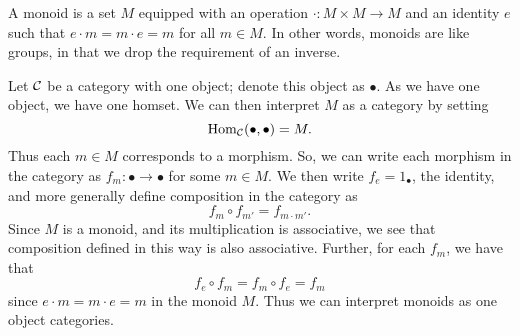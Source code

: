     \begin{example}
        A monoid is a set $M$ equipped with an operation $\cdot: M \times M \to M$ and 
        an identity $e$ such that $e\cdot m = m \cdot e = m$ for all $m \in M$. In other words, 
        monoids are like groups, in that we drop the requirement of an inverse. 

        Let $\mathcal{C}$ be a category with one object; denote this object as $\bullet$. 
        As we have one object, we have one homset. We can then interpret $M$ as a category
        by setting 
        \[
            \operatorname{\mathrm{Hom}}_{\mathcal{C}}(\bullet, \bullet) = M.   
        \]
        Thus each $m \in M$ corresponds to a morphism.
        So,
        we can write each morphism in the category as $f_{m}: \bullet \to \bullet$ 
        for some $m \in M$. 
        We then write $f_{e} = 1_{\bullet}$, the identity, and more generally 
        define composition in the category as
        \[
            f_m \circ f_{m'} = f_{m \cdot m'}.   
        \]
        Since $M$ is a monoid, and its multiplication is associative, we see that composition defined in this way is also associative. 
        Further, for each $f_m$, we have that 
        \[
            f_{e} \circ f_m =  f_m \circ f_{e} = f_m
        \]
        since $e \cdot m = m \cdot e = m$ in the monoid $M$. Thus we can interpret monoids 
        as one object categories. 
    \end{example}

